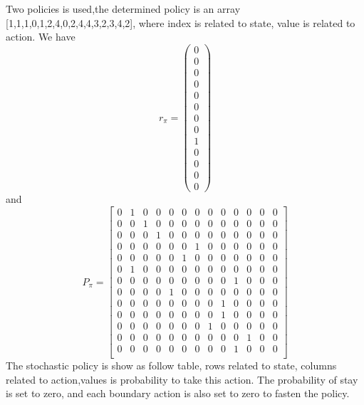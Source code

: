 \documentclass[UTF8]{ctexart}
\begin{document}
	Two policies is used,the determined policy is an array [1,1,1,0,1,2,4,0,2,4,4,3,2,3,4,2], where index is related to state, value is related to action.
	We have 
	\begin{equation}
		r_\pi= \begin{pmatrix}
			0\\
			0\\
			0\\
			0\\
			0\\
			0\\
			0\\
			0\\
			1\\
			0\\
			0\\
			0\\
			0
		\end{pmatrix}
	\end{equation}
	and 
	\begin{equation}
		P_\pi= 
		\begin{bmatrix}
			0 & 1 & 0 & 0 & 0 & 0 & 0 & 0 & 0 & 0 & 0 & 0 & 0 \\
			0 & 0 & 1 & 0 & 0 & 0 & 0 & 0 & 0 & 0 & 0 & 0 & 0 \\
			0 & 0 & 0 & 1 & 0 & 0 & 0 & 0 & 0 & 0 & 0 & 0 & 0 \\
			0 & 0 & 0 & 0 & 0 & 0 & 1 & 0 & 0 & 0 & 0 & 0 & 0 \\
			0 & 0 & 0 & 0 & 0 & 1 & 0 & 0 & 0 & 0 & 0 & 0 & 0 \\
			0 & 1 & 0 & 0 & 0 & 0 & 0 & 0 & 0 & 0 & 0 & 0 & 0\\
			0 & 0 & 0 & 0 & 0 & 0 & 0 & 0 & 0 & 1 & 0 & 0 & 0\\
			0 & 0 & 0 & 0 & 1 & 0 & 0 & 0 & 0 & 0 & 0 & 0 & 0 \\
			0 & 0 & 0 & 0 & 0 & 0 & 0 & 0 & 1 & 0 & 0 & 0 & 0 \\
			0 & 0 & 0 & 0 & 0 & 0 & 0 & 0 & 1 & 0 & 0 & 0 & 0 \\
			0 & 0 & 0 & 0 & 0 & 0 & 0 & 1 & 0 & 0 & 0 & 0 & 0 \\
			0 & 0 & 0 & 0 & 0 & 0 & 0 & 0 & 0 & 0 & 1 & 0 & 0\\
			0 & 0 & 0 & 0 & 0 & 0 & 0 & 0 & 0 & 1 & 0 & 0 & 0 \\
		\end{bmatrix}
	\end{equation}
	The stochastic policy is show as follow table, rows related to state, columns related to action,values is probability to take this action. The probability of stay is set to zero, and each boundary action is also set to zero to fasten the policy.
\end{document}
